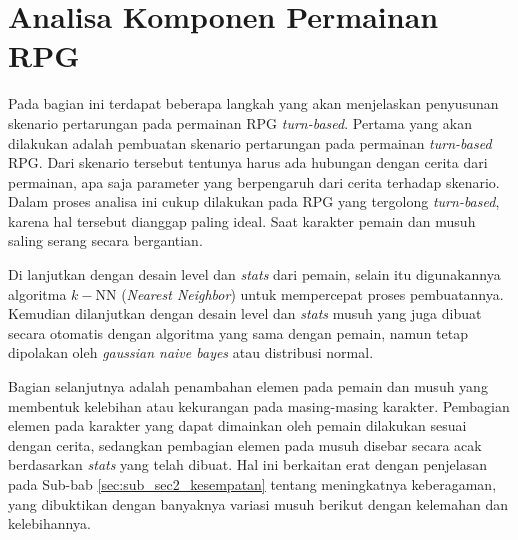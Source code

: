 \section{Analisa Komponen Permainan RPG}
\label{sec:sec3_design_komponen}
\vspace{1ex}

Pada bagian ini terdapat beberapa langkah yang akan menjelaskan penyusunan skenario pertarungan pada permainan RPG \textit{turn-based}. Pertama yang akan dilakukan adalah pembuatan skenario pertarungan pada permainan \textit{turn-based} RPG. Dari skenario tersebut tentunya harus ada hubungan dengan cerita dari permainan, apa saja parameter yang berpengaruh dari cerita terhadap skenario. Dalam proses analisa ini cukup dilakukan pada RPG yang tergolong \textit{turn-based}, karena hal tersebut dianggap paling ideal. Saat karakter pemain dan musuh saling serang secara bergantian.
\vspace{1ex}

Di lanjutkan dengan desain level dan \textit{stats} dari pemain, selain itu digunakannya algoritma $k-$NN (\textit{Nearest Neighbor}) untuk mempercepat proses pembuatannya. Kemudian dilanjutkan dengan desain level dan \textit{stats} musuh yang juga dibuat secara otomatis dengan algoritma yang sama dengan pemain, namun tetap dipolakan oleh \textit{gaussian naive bayes} atau distribusi normal. 
\vspace{1ex}

Bagian selanjutnya adalah penambahan elemen pada pemain dan musuh yang membentuk kelebihan atau kekurangan pada masing-masing karakter. Pembagian elemen pada karakter yang dapat dimainkan oleh pemain dilakukan sesuai dengan cerita, sedangkan pembagian elemen pada musuh disebar secara acak berdasarkan \textit{stats} yang telah dibuat. Hal ini berkaitan erat dengan penjelasan pada Sub-bab \ref{sec:sub_sec2_kesempatan} tentang meningkatnya keberagaman, yang dibuktikan dengan banyaknya variasi musuh berikut dengan kelemahan dan kelebihannya.
\vspace{1ex}

